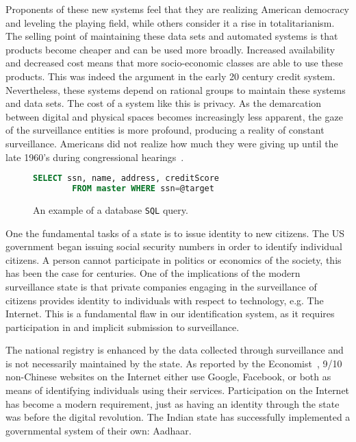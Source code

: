 Proponents of these new systems feel that they are realizing American democracy
and leveling the playing field, while others consider it a rise in
totalitarianism. The selling point of maintaining these data sets and
automated systems is that products become cheaper and can be used more broadly.
Increased availability and decreased cost means that more socio-economic
classes are able to use these products. This was indeed the argument in the
early 20 century credit system. Nevertheless, these systems depend on
rational groups to maintain these systems and data sets. The cost of a system
like this is privacy. As the demarcation between digital and physical spaces
becomes increasingly less apparent, the gaze of the surveillance entities is
more profound, producing a reality of constant surveillance. Americans did not
realize how much they were giving up until the late 1960's during congressional
hearings~\cite{lauer2017creditworthy}.

\begin{figure}[h]
\begin{lstlisting}[language=SQL, basicstyle=\sffamily]
		SELECT ssn, name, address, creditScore
		FROM master WHERE ssn=@target
\end{lstlisting}
\caption{An example of a database \texttt{SQL} query.}
\label{fig:sql}
\end{figure}


One the fundamental tasks of a state is to issue identity to new citizens.
The US government began issuing social security numbers in order to identify
individual citizens.
A person cannot participate in politics or economics of the society, this has been the case for centuries.
One of the implications of the modern
surveillance state is that private companies engaging in the surveillance of
citizens provides identity to individuals with respect to technology, e.g. The
Internet. This is a fundamental flaw in our identification system, as it
requires participation in and implicit submission to surveillance.

The national registry is enhanced by the data collected through surveillance
and is not necessarily maintained by the state. As reported by the
Economist~\cite{identity2018economist}, 9/10
non-Chinese websites on the Internet either use Google, Facebook, or both as means of
identifying individuals using their services. Participation on the Internet has
become a modern requirement, just as having an identity through the state was
before the digital revolution. The Indian state has successfully implemented
a governmental system of their own: Aadhaar.

